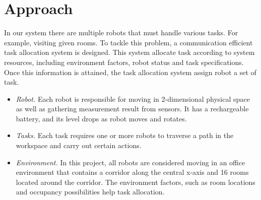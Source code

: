 \chapter{Approach}


In our system there are multiple robots that must handle various tasks. For example, visiting given rooms. To tackle this problem, a communication efficient task allocation system is designed. 
This system allocate task according to system resources, including environment factors, robot status and task specifications. Once this information is attained, the task allocation system assign robot a set of task.

\begin{itemize}
	\item \textsl{Robot.} Each robot is responsible for moving in 2-dimensional physical space as well as gathering measurement result from sensors. It has a rechargeable battery, and its level drops as robot moves and rotates.
	\item \textsl{Tasks.} Each task requires one or more robots to traverse a path in the workspace and carry out certain actions\cite{Ivan2017}.
	\item \textsl{Environment.} In this project, all robots are considered moving in an office environment that contains a corridor along the central x-axis and 16 rooms located around the corridor. The environment factors, such as room locations and occupancy possibilities help task allocation.
\end{itemize}

